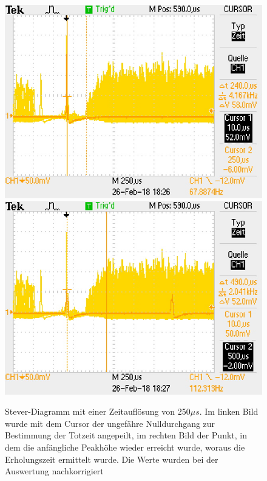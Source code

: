 \documentclass[12pt,a4paper]{article}
\begin{document}
\begin{figure}
\centering
\includegraphics[scale=0.49]{Bilder/Stever/Stever1_1.PNG}
\includegraphics[scale=0.49]{Bilder/Stever/Stever1_2.PNG}
\caption{Stever-Diagramm mit einer Zeitauflösung von 250$\mu s$. Im linken Bild wurde mit dem Cursor der ungefähre Nulldurchgang zur Bestimmung der Totzeit angepeilt, im rechten Bild der Punkt, in dem die anfängliche Peakhöhe wieder erreicht wurde, woraus die Erholungszeit ermittelt wurde. Die Werte wurden bei der Auswertung nachkorrigiert}
\label{fig:Stever}
\end{figure}
\end{document}
